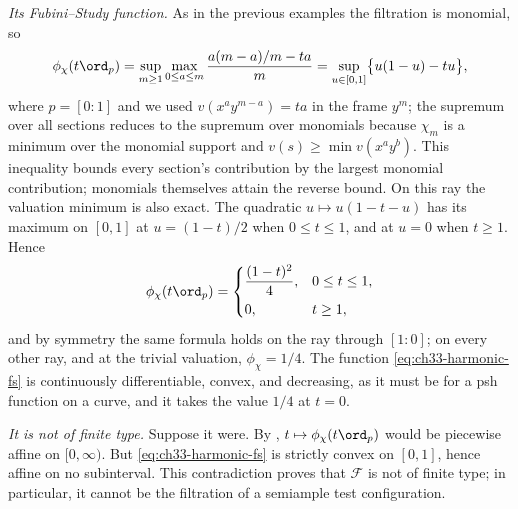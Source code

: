 \begin{example}
\emph{Its Fubini--Study function.}  As in the previous examples the
filtration is monomial, so
\[
 \phi_\chi(t\ord_p)
 =\sup_{m\geq1}\max_{0\leq a\leq m}
    \frac{a(m-a)/m-ta}{m}
 =\sup_{u\in[0,1]}\bigl\{u(1-u)-tu\bigr\},
\]
where $p=[0:1]$ and we used $v(x^ay^{m-a})=ta$ in the frame $y^m$; the
supremum over all sections reduces to the supremum over monomials because
$\chi_m$ is a minimum over the monomial support and
$v(s)\geq\min v(x^ay^b)$.  This inequality bounds every section's
contribution by the largest monomial contribution; monomials themselves
attain the reverse bound.  On this ray the valuation minimum is also exact.
The quadratic $u\mapsto u(1-t-u)$ has its maximum on $[0,1]$ at
$u=(1-t)/2$ when $0\leq t\leq1$, and at $u=0$ when $t\geq1$.  Hence
\begin{equation}
\label{eq:ch33-harmonic-fs}
 \phi_\chi(t\ord_p)=
 \begin{cases}
  \dfrac{(1-t)^2}{4}, & 0\leq t\leq1,\\[2mm]
  0,& t\geq1,
 \end{cases}
\end{equation}
and by symmetry the same formula holds on the ray through $[1:0]$; on
every other ray, and at the trivial valuation, $\phi_\chi=1/4$.  The
function \eqref{eq:ch33-harmonic-fs} is continuously differentiable,
convex, and decreasing, as it must be for a psh function on a curve, and it
takes the value $1/4$ at $t=0$.

\emph{It is not of finite type.}  Suppose it were.  By
, $t\mapsto\phi_\chi(t\ord_p)$ would be
piecewise affine on $[0,\infty)$.  But \eqref{eq:ch33-harmonic-fs} is
strictly convex on $[0,1]$, hence affine on no subinterval.  This
contradiction proves that $\mathcal F$ is not of finite type; in particular,
it cannot be the filtration of a semiample test configuration.


\end{example}
